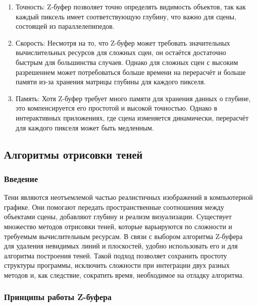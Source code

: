 \begin{enumerate}
\item Точность: Z-буфер позволяет точно определять видимость объектов, так как каждый пиксель имеет соответствующую глубину, что важно для сцены, состоящей из параллелепипедов.

\item Скорость: Несмотря на то, что Z-буфер может требовать значительных вычислительных ресурсов для сложных сцен, он остаётся достаточно быстрым для большинства случаев. Однако для сложных сцен с высоким разрешением может потребоваться больше времени на перерасчёт и больше памяти из-за хранения матрицы глубины для каждого пикселя.

\item Память: Хотя Z-буфер требует много памяти для хранения данных о глубине, это компенсируется его простотой и высокой точностью. Однако в интерактивных приложениях, где сцена изменяется динамически, перерасчёт для каждого пикселя может быть медленным.
\end{enumerate}



\subsection{Алгоритмы отрисовки теней}


\subsubsection{Введение}

\hspace{1.25cm}
Тени являются неотъемлемой частью реалистичных изображений в компьютерной графике. Они помогают передать пространственные соотношения между объектами сцены, добавляют глубину и реализм визуализации. Существует множество методов отрисовки теней, которые варьируются по сложности и требуемым вычислительным ресурсам. В связи с выбором алгоритма Z-буфера для удаления невидимых линий и плоскостей, удобно использовать его и для алгоритма построения теней. Такой подход позволяет сохранить простоту структуры программы, исключить сложности при интеграции двух разных методов и, как следствие, сократить время, необходимое на отладку алгоритма.


\subsubsection{Принципы работы Z-буфера}

